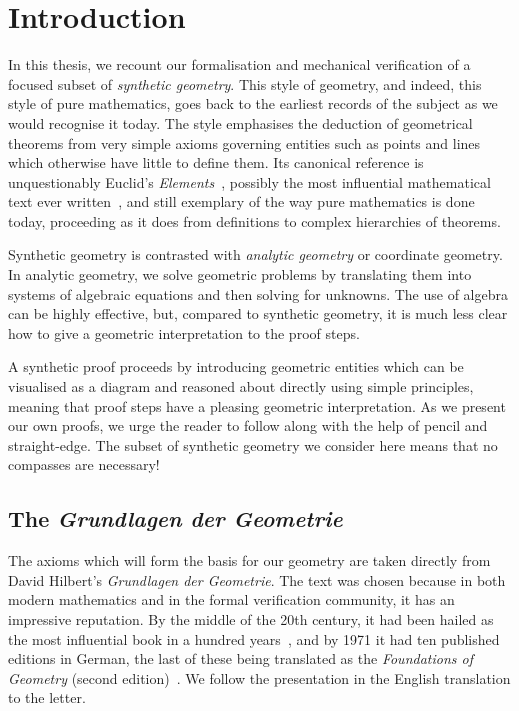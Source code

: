 \chapter{Introduction}\label{chapter:Introduction}
In this thesis, we recount our formalisation and mechanical verification of a focused subset of \emph{synthetic geometry}. This style of geometry, and indeed, this style of pure mathematics, goes back to the earliest records of the subject as we would recognise it today. The style emphasises the deduction of geometrical theorems from very simple axioms governing entities such as points and lines which otherwise have little to define them. Its canonical reference is unquestionably Euclid's \emph{Elements}~\cite{HeathElements}, possibly the most influential mathematical text ever written~\cite{BoyerEuclidInfluence}, and still exemplary of the way pure mathematics is done today, proceeding as it does from definitions to complex hierarchies of theorems.

Synthetic geometry is contrasted with \emph{analytic geometry} or coordinate geometry. In analytic geometry, we solve geometric problems by translating them into systems of algebraic equations and then solving for unknowns. The use of algebra can be highly effective, but, compared to synthetic geometry, it is much less clear how to give a geometric interpretation to the proof steps.

A synthetic proof proceeds by introducing geometric entities which can be visualised as a diagram and reasoned about directly using simple principles, meaning that proof steps have a pleasing geometric interpretation. As we present our own proofs, we urge the reader to follow along with the help of pencil and straight-edge. The subset of synthetic geometry we consider here means that no compasses are necessary!

\section{The \emph{Grundlagen der Geometrie}}
The axioms which will form the basis for our geometry are taken directly from David Hilbert's \emph{Grundlagen der Geometrie}. The text was chosen because in both modern mathematics and in the formal verification community, it has an impressive reputation. By the middle of the 20th century, it had been hailed as the most influential book in a hundred years~\cite{BirkhoffHilbertInfluence}, and by 1971 it had ten published editions in German, the last of these being translated as the \emph{Foundations of Geometry} (second edition)~\cite{FoundationsOfGeometry}. We follow the presentation in the English translation to the letter. 

